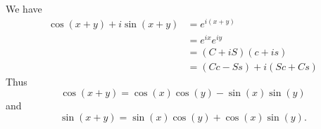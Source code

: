 \documentclass[12pt]{article}
\begin{document}
We have
\begin{align*}
    \cos(x + y) + i \sin(x + y) &= e^{i(x + y)} \\
    &= e^{ix} e^{iy} \\
    &= (C + i S)(c + i s) \\
    &= (Cc - Ss) + i (Sc + Cs)
\end{align*}
Thus
\[ \cos(x + y) = \cos(x) \cos(y) - \sin(x) \sin(y) \]
and
\[ \sin(x + y) = \sin(x) \cos(y) + \cos(x) \sin(y). \]



\noindent
\begin{tikzpicture}[x=0.75pt,y=0.75pt,yscale=-1,xscale=1]


\end{tikzpicture}
\end{document}
